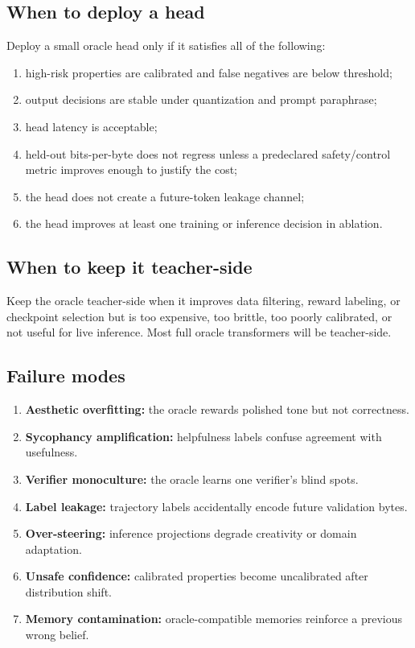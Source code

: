\documentclass[11pt]{article}
\numberwithin{equation}{section}
\begin{document}
\subsection{When to deploy a head}
Deploy a small oracle head only if it satisfies all of the following:
\begin{enumerate}
\item high-risk properties are calibrated and false negatives are below threshold;
\item output decisions are stable under quantization and prompt paraphrase;
\item head latency is acceptable;
\item held-out bits-per-byte does not regress unless a predeclared safety/control metric improves enough to justify the cost;
\item the head does not create a future-token leakage channel;
\item the head improves at least one training or inference decision in ablation.
\end{enumerate}

\subsection{When to keep it teacher-side}
Keep the oracle teacher-side when it improves data filtering, reward labeling, or checkpoint selection but is too expensive, too brittle, too poorly calibrated, or not useful for live inference. Most full oracle transformers will be teacher-side.

\subsection{Failure modes}
\begin{enumerate}
\item \textbf{Aesthetic overfitting:} the oracle rewards polished tone but not correctness.
\item \textbf{Sycophancy amplification:} helpfulness labels confuse agreement with usefulness.
\item \textbf{Verifier monoculture:} the oracle learns one verifier's blind spots.
\item \textbf{Label leakage:} trajectory labels accidentally encode future validation bytes.
\item \textbf{Over-steering:} inference projections degrade creativity or domain adaptation.
\item \textbf{Unsafe confidence:} calibrated properties become uncalibrated after distribution shift.
\item \textbf{Memory contamination:} oracle-compatible memories reinforce a previous wrong belief.
\end{enumerate}
\end{document}
